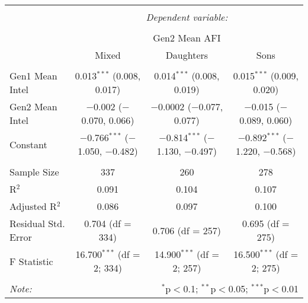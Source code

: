 
\begingroup 
\small 
\begin{tabular}{@{\extracolsep{1pt}}lccc} 
\\[-1.8ex]\hline 
\hline \\[-1.8ex] 
 & \multicolumn{3}{c}{\textit{Dependent variable:}} \\ 
\cline{2-4} 
\\[-1.8ex] & \multicolumn{3}{c}{Gen2 Mean AFI} \\ 
 & Mixed & Daughters & Sons \\ 
\hline \\[-1.8ex] 
 Gen1 Mean Intel & 0.013$^{***}$ (0.008, 0.017) & 0.014$^{***}$ (0.008, 0.019) & 0.015$^{***}$ (0.009, 0.020) \\ 
  Gen2 Mean Intel & $-$0.002 ($-$0.070, 0.066) & $-$0.0002 ($-$0.077, 0.077) & $-$0.015 ($-$0.089, 0.060) \\ 
  Constant & $-$0.766$^{***}$ ($-$1.050, $-$0.482) & $-$0.814$^{***}$ ($-$1.130, $-$0.497) & $-$0.892$^{***}$ ($-$1.220, $-$0.568) \\ 
 \hline \\[-1.8ex] 
Sample Size & 337 & 260 & 278 \\ 
R$^{2}$ & 0.091 & 0.104 & 0.107 \\ 
Adjusted R$^{2}$ & 0.086 & 0.097 & 0.100 \\ 
Residual Std. Error & 0.704 (df = 334) & 0.706 (df = 257) & 0.695 (df = 275) \\ 
F Statistic & 16.700$^{***}$ (df = 2; 334) & 14.900$^{***}$ (df = 2; 257) & 16.500$^{***}$ (df = 2; 275) \\ 
\hline 
\hline \\[-1.8ex] 
\textit{Note:}  & \multicolumn{3}{r}{$^{*}$p$<$0.1; $^{**}$p$<$0.05; $^{***}$p$<$0.01} \\ 
\end{tabular} 
\endgroup 
